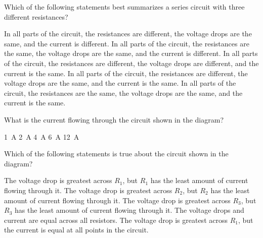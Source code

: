 \documentclass{../../../oss-ap12ibhl}
\begin{document}
\genheader

\begin{questions}
  \question Which of the following statements best summarizes a series circuit
  with three different resistances?
  \begin{choices}
    \choice In all parts of the circuit, the resistances are different, the
    voltage drops are the same, and the current is different.
    \choice In all parts of the circuit, the resistances are the same, the
    voltage drops are the same, and the current is different.
    \choice In all parts of the circuit, the resistances are different, the
    voltage drops are different, and the current is the same.
    \choice In all parts of the circuit, the resistances are different, the
    voltage drops are the same, and the current is the same.
    \choice In all parts of the circuit, the resistances are the same, the
    voltage drops are the same, and the current is the same.
  \end{choices}
  \vspace{.7in}

  
  \question What is the current flowing through the circuit shown in the
  diagram?
  \begin{choices}
    \choice\SI{1}{\ampere}
    \choice\SI{2}{\ampere}
    \choice\SI{4}{\ampere}
    \choice\SI{6}{\ampere}
    \choice\SI{12}{\ampere}
  \end{choices}
  \label{series1}
    
  \question Which of the following statements is true about the circuit shown
  in the diagram?
  \begin{choices}
    \choice The voltage drop is greatest across $R_1$, but $R_1$ has the least
    amount of current flowing through it.
    \choice The voltage drop is greatest across $R_2$, but $R_2$ has the least
    amount of current flowing through it.
    \choice The voltage drop is greatest across $R_3$, but $R_3$ has the least
    amount of current flowing through it.
    \choice The voltage drops and current are equal across all resistors.
    \choice The voltage drop is greatest across $R_1$, but the current is
    equal at all points in the circuit.
  \end{choices}
  \vspace{.7in}
    

\end{questions}
\end{document}

